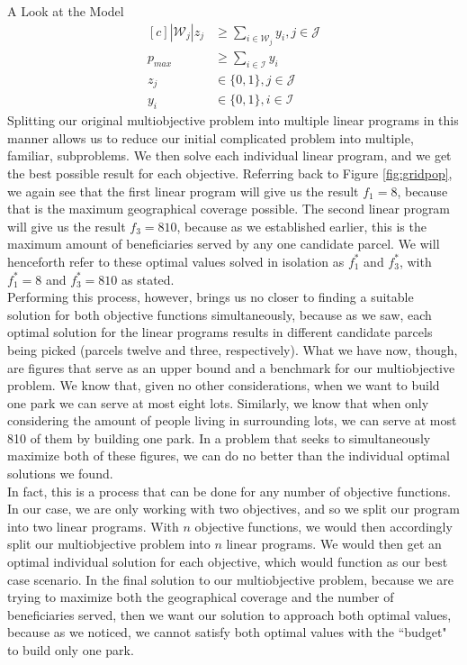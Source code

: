 \documentclass[12pt]{pom_thesis}
\theoremstyle{definition}
\begin{document}
\begin{chapter}{A Look at the Model}
\begin{equation*}
\begin{aligned}[c]
\left|\mathcal{W}_j\right|z_j &\geq \sum_{i \in \mathcal{W}_j} y_i, j \in \mathcal{J} \\
p_{max} &\geq \sum_{i \in \mathcal{I}} y_i  \\
z_j &\in \{0,1\}, j \in \mathcal{J} \\
y_i &\in \{0,1\}, i \in \mathcal{I}
\end{aligned}
\end{equation*}
Splitting our original multiobjective problem into multiple linear programs in this manner allows us to reduce our initial complicated problem into multiple, familiar, subproblems. We then solve each individual linear program, and we get the best possible result for each objective. Referring back to Figure \ref{fig:gridpop}, we again see that the first linear program will give us the result $f_1 = 8$, because that is the maximum geographical coverage possible. The second linear program will give us the result $f_3 = 810$, because as we established earlier, this is the maximum amount of beneficiaries served by any one candidate parcel. We will henceforth refer to these optimal values solved in isolation as $f_1^*$ and $f_3^*$, with $f_1^* = 8$ and $f_3^* = 810$ as stated. \\

Performing this process, however, brings us no closer to finding a suitable solution for both objective functions simultaneously, because as we saw, each	optimal solution for the linear programs results in different candidate parcels being picked (parcels twelve and three, respectively). What we have now, though, are figures that serve as an upper bound and a benchmark for our multiobjective problem. We know that, given no other considerations, when we want to build one park we can serve at most eight lots. Similarly, we know that when only considering the amount of people living in surrounding lots, we can serve at most 810 of them by building one park. In a problem that seeks to simultaneously maximize both of these figures, we can do no better than the individual optimal solutions we found. \\

In fact, this is a process that can be done for any number of objective functions. In our case, we are only working with two objectives, and so we split our program into two linear programs. With $n$ objective functions, we would then accordingly split our multiobjective problem into $n$ linear programs. We would then get an optimal individual solution for each objective, which would function as our best case scenario. In the final solution to our multiobjective problem, because we are trying to maximize both the geographical coverage and the number of beneficiaries served, then we want our solution to approach both optimal values, because as we noticed, we cannot satisfy both optimal values with the ``budget" to build only one park. \\


\end{chapter}
\end{document}
